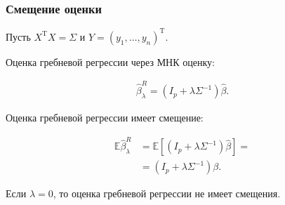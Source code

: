 \documentclass[unicode, notheorems]{beamer}
\newcommand{\E}{\mathbb{E}}
\newcommand{\T}{\mathrm{T}}
\begin{document}
\begin{frame}
\frametitle{Смещение оценки}

Пусть $X^{\T}X = \Sigma$ и $Y = (y_1, \ldots, y_n)^{\T}$.

Оценка гребневой регрессии через МНК оценку:

\begin{align*}
\hat{\beta}_{\lambda}^R = (I_p + \lambda \Sigma^{-1})\hat{\beta}.  
\end{align*}


Оценка гребневой регрессии имеет смещение:

\begin{align*}
\E\hat{\beta}_{\lambda}^{R} &= \E[(I_p + \lambda \Sigma^{-1})\hat{\beta}] = \\
	&= (I_p + \lambda \Sigma^{-1})\beta.
\end{align*} 

Если $\lambda = 0$, то оценка гребневой регрессии не имеет смещения.
\end{frame}




%
%
%
\end{document}
